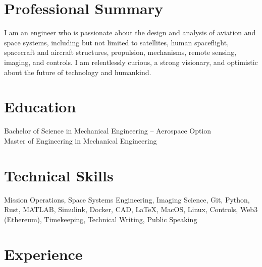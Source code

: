 \documentclass[10pt,final,sans]{resume}
\begin{document}
\setlength\headheight{28pt} %
 

\section{Professional Summary}
I am an engineer who is passionate about the design and analysis of aviation and
space systems, including but not limited to satellites, human spaceflight,
spacecraft and aircraft structures, propulsion, mechanisms, remote sensing,
imaging, and controls. I am relentlessly curious, a strong visionary, and
optimistic about the future of technology and humankind.

\section{Education}
Bachelor of Science in Mechanical Engineering -- Aerospace Option \\
Master of Engineering in Mechanical Engineering

\section{Technical Skills}
Mission Operations, Space Systems Engineering, Imaging Science, Git, Python, Rust, MATLAB, Simulink, Docker, CAD,
{\textrm \LaTeX}, MacOS, Linux, Controls, Web3 (Ethereum), Timekeeping, Technical Writing, Public Speaking

\section{Experience}
\end{document}

